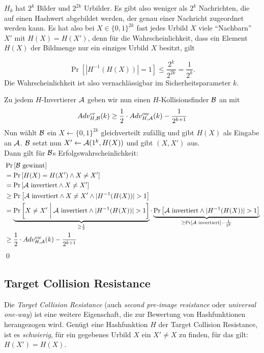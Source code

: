 \begin{beweisidee}
$H_k$ hat $2^k$ Bilder und $2^{2k}$ Urbilder. Es gibt also weniger als
$2^k$ Nachrichten, die auf einen Hashwert abgebildet werden, der genau einer
Nachricht zugeordnet werden kann. Es hat also bei $X \in \{0,1\}^{2k}$ fast jedes
Urbild $X$ viele "`Nachbarn"' $X'$ mit $H(X) = H(X')$, denn für die
Wahrscheinlichkeit, dass ein Element $H(X)$ der Bildmenge nur ein
einziges Urbild $X$ besitzt, gilt

\begin{equation*}
\Pr \left[ | H^{-1}(H(X))| = 1\right] \leq \frac{2^k}{2^{2k}} = \frac{1}{2^k}.
\end{equation*}
Die Wahrscheinlichkeit ist also vernachlässigbar im Sicherheitsparameter
$k$.
\end{beweisidee}

\begin{beweis}
Zu jedem $H$-Invertierer $\mathcal{A}$ geben wir nun einen $H$-Kollisionsfinder $\mathcal{B}$ an mit
\begin{equation*}
Adv^{cr}_{H,\mathcal{B}}(k) \geq \frac{1}{2} \cdot Adv^{ow}_{H,\mathcal{A}}(k) - \frac{1}{2^{k+1}}
\end{equation*} 
Nun wählt $\mathcal{B}$ ein $X \leftarrow \{0,1\}^{2k}$ gleichverteilt zufällig und gibt $H(X)$ als Eingabe an $\mathcal{A}$. $\mathcal{B}$ setzt nun $X' \leftarrow \mathcal{A}(1^k, H(X))$ und
gibt $(X, X')$ aus.\\
Dann gilt für $\mathcal{B}$s Erfolgswahrscheinlichkeit:
\begin{align*}
	&\Pr \left[\mathcal{B} \text{ gewinnt}\right]\\
	&= \Pr\left[H(X) = H(X') \land X \not = X'\right]\\
	&= \Pr \left[\mathcal{A} \text{ invertiert} \land X \not = X'\right]\\
	&\geq \Pr \left[\mathcal{A} \text{ invertiert} \land X \not = X' \land \vert H^{-1}(H(X)) \vert > 1\right]\\
	&= \underbrace{\Pr \left[X \not = X' \biggm| \mathcal{A} \text{ invertiert} \land \vert H^{-1}(H(X)) \vert > 1\right]}_{\geq \frac{1}{2}}
	\cdot \underbrace{\Pr \left[\mathcal{A} \text{ invertiert} \land \vert H^{-1}(H(X)) \vert > 1\right]}_{\geq \Pr \left[\mathcal{A} \text{ invertiert}\right] - \frac{1}{2^k}}\\
	&\geq \frac{1}{2} \cdot Adv^{ow}_{H,\mathcal{A}}(k) - \frac{1}{2^{k+1}}
\end{align*}
\qed
\end{beweis}


\subsection{Target Collision Resistance}
Die \textit{Target Collision Resistance} (auch \textit{second pre-image resistance} oder \textit{universal one-way}) ist eine weitere Eigenschaft, die zur
Bewertung von Hashfunktionen herangezogen wird. Genügt eine Hashfunktion $H$ der Target Collision Resistance, ist es \textit{schwierig}, für ein gegebenes
Urbild $X$ ein $X' \not = X$ zu finden, für das gilt: $H(X') = H(X)$.

